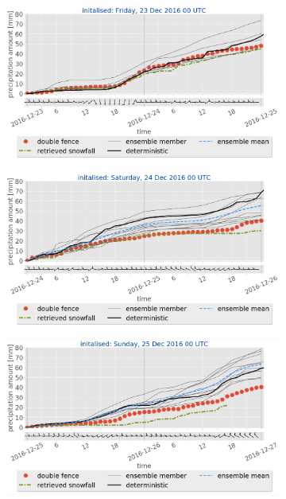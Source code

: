 \begin{figure}[H]\ContinuedFloat
	\centering
	\begin{subfigure}[t]{0.85\textwidth}	\includegraphics[trim={0.cm 5.2cm 0.cm 0cm},clip,width=\textwidth]{./fig_sfc_acc/acc_wind_20161223_00}
		\caption{}\label{fig:sfc_acc23}
	\end{subfigure}
	\begin{subfigure}[t]{0.85\textwidth}			\includegraphics[trim={0.cm 5.2cm 0.cm 0cm},clip,width=\textwidth]{./fig_sfc_acc/acc_wind_20161224_00}
		\caption{}\label{fig:sfc_acc24}
	\end{subfigure}
	\begin{subfigure}[t]{0.85\textwidth}
		\includegraphics[trim={0.cm 3.6cm 0.cm 0cm},clip,width=\textwidth]{./fig_sfc_acc/acc_wind_20161225_00}

\end{subfigure}
\end{figure}
